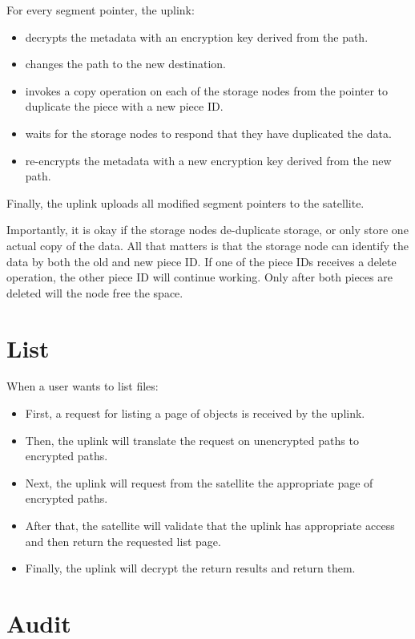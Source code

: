 \documentclass[11pt,fleqn,openany]{book}
\begin{document}
For every segment pointer, the uplink:
  \begin{itemize}
  \item decrypts the metadata with an encryption key derived from the path.
  \item changes the path to the new destination.
  \item invokes a copy operation on each of the storage nodes from the pointer
    to duplicate the piece with a new piece ID.
  \item waits for the storage nodes to respond that they have duplicated the
    data.
  \item re-encrypts the metadata with a new encryption key derived from the
    new path.
  \end{itemize}

Finally, the uplink uploads all modified segment pointers to the satellite.

Importantly, it is okay if the storage nodes de-duplicate storage, or only
store one actual copy of the data. All that matters is that the storage node
can identify the data by both the old and new piece ID. If one of the piece
IDs receives a delete operation, the other piece ID will continue working.
Only after both pieces are deleted will the node free the space.

\section{List}

When a user wants to list files:

\begin{itemize}
\item First, a request for listing a page of objects is received by the uplink.
\item Then, the uplink will translate the request on unencrypted paths to encrypted
  paths.
\item Next, the uplink will request from the satellite the appropriate page of
  encrypted paths.
\item After that, the satellite will validate that the uplink has appropriate access
  and then return the requested list page.
\item Finally, the uplink will decrypt the return results and return them.
\end{itemize}

\section{Audit}
\end{document}
